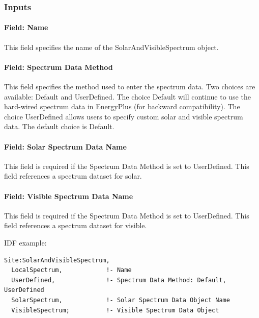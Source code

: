 \subsubsection{Inputs}\label{inputs-24-001}

\paragraph{Field: Name}\label{field-name-10-008}

This field specifies the name of the SolarAndVisibleSpectrum object.

\paragraph{Field: Spectrum Data Method}\label{field-spectrum-data-method}

This field specifies the method used to enter the spectrum data. Two choices are available: Default and UserDefined. The choice Default will continue to use the hard-wired spectrum data in EnergyPlus (for backward compatibility). The choice UserDefined allows users to specify custom solar and visible spectrum data. The default choice is Default.

\paragraph{Field: Solar Spectrum Data Name}\label{field-solar-spectrum-data-name}

This field is required if the Spectrum Data Method is set to UserDefined. This field references a spectrum dataset for solar.

\paragraph{Field: Visible Spectrum Data Name}\label{field-visible-spectrum-data-name}

This field is required if the Spectrum Data Method is set to UserDefined. This field references a spectrum dataset for visible.

IDF example:

\begin{lstlisting}
Site:SolarAndVisibleSpectrum,
  LocalSpectrum,            !- Name
  UserDefined,              !- Spectrum Data Method: Default, UserDefined
  SolarSpectrum,            !- Solar Spectrum Data Object Name
  VisibleSpectrum;          !- Visible Spectrum Data Object
\end{lstlisting}

